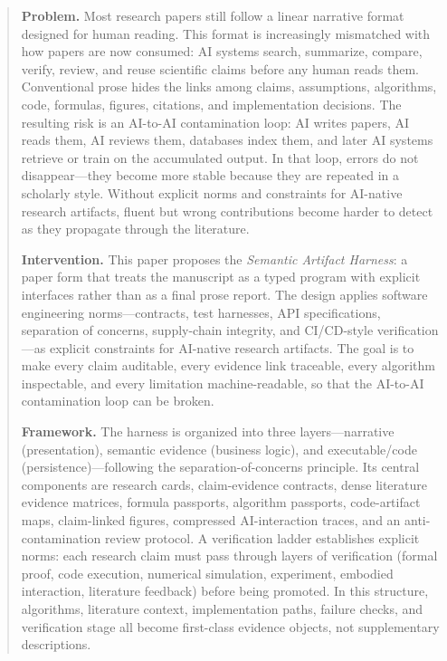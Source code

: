 \documentclass{article}
\begin{document}
\begin{abstract}
\textbf{Problem.}
Most research papers still follow a linear narrative format designed for human reading. This format is increasingly mismatched with how papers are now consumed: AI systems search, summarize, compare, verify, review, and reuse scientific claims before any human reads them. Conventional prose hides the links among claims, assumptions, algorithms, code, formulas, figures, citations, and implementation decisions. The resulting risk is an AI-to-AI contamination loop: AI writes papers, AI reads them, AI reviews them, databases index them, and later AI systems retrieve or train on the accumulated output. In that loop, errors do not disappear---they become more stable because they are repeated in a scholarly style. Without explicit norms and constraints for AI-native research artifacts, fluent but wrong contributions become harder to detect as they propagate through the literature.

\textbf{Intervention.}
This paper proposes the \emph{Semantic Artifact Harness}: a paper form that treats the manuscript as a typed program with explicit interfaces rather than as a final prose report. The design applies software engineering norms---contracts, test harnesses, API specifications, separation of concerns, supply-chain integrity, and CI/CD-style verification---as explicit constraints for AI-native research artifacts. The goal is to make every claim auditable, every evidence link traceable, every algorithm inspectable, and every limitation machine-readable, so that the AI-to-AI contamination loop can be broken.

\textbf{Framework.}
The harness is organized into three layers---narrative (presentation), semantic evidence (business logic), and executable/code (persistence)---following the separation-of-concerns principle. Its central components are research cards, claim-evidence contracts, dense literature evidence matrices, formula passports, algorithm passports, code-artifact maps, claim-linked figures, compressed AI-interaction traces, and an anti-contamination review protocol. A verification ladder establishes explicit norms: each research claim must pass through layers of verification (formal proof, code execution, numerical simulation, experiment, embodied interaction, literature feedback) before being promoted. In this structure, algorithms, literature context, implementation paths, failure checks, and verification stage all become first-class evidence objects, not supplementary descriptions.


\end{abstract}
\end{document}
